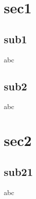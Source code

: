 \documentclass{beamer}
\begin{document}
    
\section{sec1}
\subsection{sub1}
\begin{frame}
    abc
\end{frame} 

\subsection{sub2}
\begin{frame}
    abc
\end{frame} 

\section{sec2}
\subsection{sub21}
\begin{frame}
    abc
\end{frame} 
    
\end{document}

